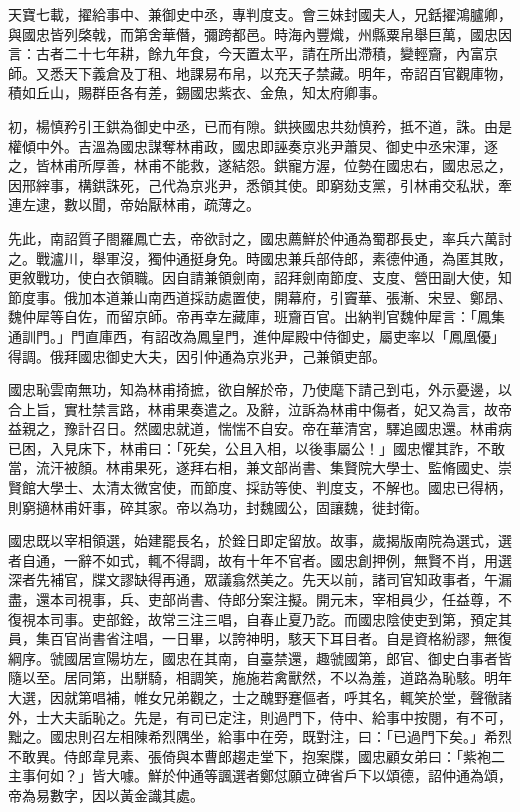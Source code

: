 \begin{pinyinscope}
 天寶七載，擢給事中、兼御史中丞，專判度支。會三妹封國夫人，兄銛擢鴻臚卿，與國忠皆列棨戟，而第舍華僭，彌跨都邑。時海內豐熾，州縣粟帛舉巨萬，國忠因言：古者二十七年耕，餘九年食，今天置太平，請在所出滯積，變輕齎，內富京師。又悉天下義倉及丁租、地課易布帛，以充天子禁藏。明年，帝詔百官觀庫物，積如丘山，賜群臣各有差，錫國忠紫衣、金魚，知太府卿事。



 初，楊慎矜引王鉷為御史中丞，已而有隙。鉷挾國忠共劾慎矜，抵不道，誅。由是權傾中外。吉溫為國忠謀奪林甫政，國忠即誣奏京兆尹蕭炅、御史中丞宋渾，逐之，皆林甫所厚善，林甫不能救，遂結怨。鉷寵方渥，位勢在國忠右，國忠忌之，因邢縡事，構鉷誅死，己代為京兆尹，悉領其使。即窮劾支黨，引林甫交私狀，牽連左逮，數以聞，帝始厭林甫，疏薄之。



 先此，南詔質子閤羅鳳亡去，帝欲討之，國忠薦鮮於仲通為蜀郡長史，率兵六萬討之。戰瀘川，舉軍沒，獨仲通挺身免。時國忠兼兵部侍郎，素德仲通，為匿其敗，更敘戰功，使白衣領職。因自請兼領劍南，詔拜劍南節度、支度、營田副大使，知節度事。俄加本道兼山南西道採訪處置使，開幕府，引竇華、張漸、宋昱、鄭昂、魏仲犀等自佐，而留京師。帝再幸左藏庫，班齎百官。出納判官魏仲犀言：「鳳集通訓門。」門直庫西，有詔改為鳳皇門，進仲犀殿中侍御史，屬吏率以「鳳凰優」得調。俄拜國忠御史大夫，因引仲通為京兆尹，己兼領吏部。



 國忠恥雲南無功，知為林甫掎摭，欲自解於帝，乃使麾下請己到屯，外示憂邊，以合上旨，實杜禁言路，林甫果奏遣之。及辭，泣訴為林甫中傷者，妃又為言，故帝益親之，豫計召日。然國忠就道，惴惴不自安。帝在華清宮，驛追國忠還。林甫病已困，入見床下，林甫曰：「死矣，公且入相，以後事屬公！」國忠懼其詐，不敢當，流汗被顏。林甫果死，遂拜右相，兼文部尚書、集賢院大學士、監脩國史、崇賢館大學士、太清太微宮使，而節度、採訪等使、判度支，不解也。國忠已得柄，則窮擿林甫奸事，碎其家。帝以為功，封魏國公，固讓魏，徙封衛。



 國忠既以宰相領選，始建罷長名，於銓日即定留放。故事，歲揭版南院為選式，選者自通，一辭不如式，輒不得調，故有十年不官者。國忠創押例，無賢不肖，用選深者先補官，牒文謬缺得再通，眾議翕然美之。先天以前，諸司官知政事者，午漏盡，還本司視事，兵、吏部尚書、侍郎分案注擬。開元末，宰相員少，任益尊，不復視本司事。吏部銓，故常三注三唱，自春止夏乃訖。而國忠陰使吏到第，預定其員，集百官尚書省注唱，一日畢，以誇神明，駭天下耳目者。自是資格紛謬，無復綱序。虢國居宣陽坊左，國忠在其南，自臺禁還，趣虢國第，郎官、御史白事者皆隨以至。居同第，出駢騎，相調笑，施施若禽獸然，不以為羞，道路為恥駭。明年大選，因就第唱補，帷女兄弟觀之，士之醜野蹇傴者，呼其名，輒笑於堂，聲徹諸外，士大夫詬恥之。先是，有司已定注，則過門下，侍中、給事中按閱，有不可，黜之。國忠則召左相陳希烈隅坐，給事中在旁，既對注，曰：「已過門下矣。」希烈不敢異。侍郎韋見素、張倚與本曹郎趨走堂下，抱案牒，國忠顧女弟曰：「紫袍二主事何如？」皆大噱。鮮於仲通等諷選者鄭怤願立碑省戶下以頌德，詔仲通為頌，帝為易數字，因以黃金識其處。




\end{pinyinscope}
